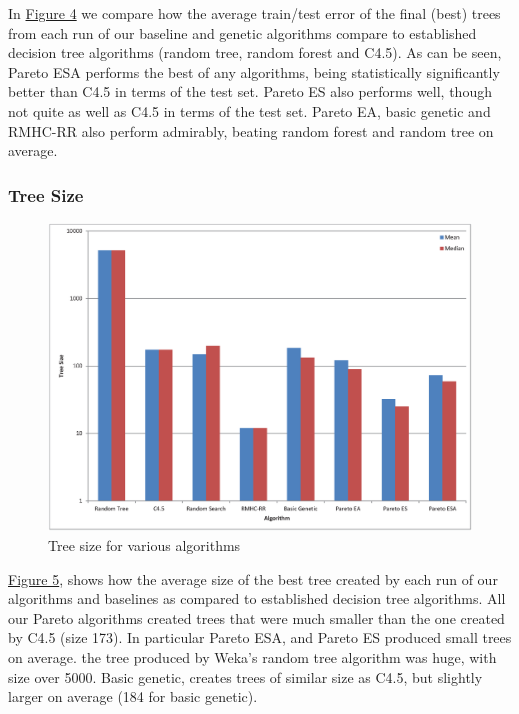 \documentclass{acm_proc_article-sp}
\begin{document}
In \hyperref[algorithms]{Figure 4} we compare how the average train/test error of the final (best) trees from each run of our baseline and genetic algorithms compare to established decision tree algorithms (random tree, random forest and C4.5). As can be seen, Pareto ESA performs the best of any algorithms, being statistically significantly better than C4.5 in terms of the test set. Pareto ES also performs well, though not quite as well as C4.5 in terms of the test set. Pareto EA, basic genetic and RMHC-RR also perform admirably, beating random forest and random tree on average.

\subsubsection{Tree Size}

\begin{figure}[h]
\centering
\includegraphics[width=\linewidth]{size_chart.eps}
\caption{Tree size for various algorithms}\label{size}
\end{figure}

\hyperref[size]{Figure 5}, shows how the average size of the best tree created by each run of our algorithms and baselines as compared to established decision tree algorithms. All our Pareto algorithms created trees that were much smaller than the one created by C4.5 (size 173). In particular Pareto ESA, and Pareto ES produced small trees on average. the tree produced by Weka's \cite{Hall:2009} random tree algorithm was huge, with size over 5000. Basic genetic, creates trees of similar size as C4.5, but slightly larger on average (184 for basic genetic).
\end{document}
